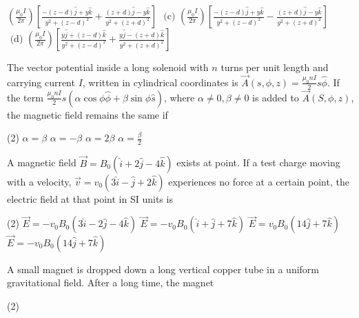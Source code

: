\begin{enumerate}
\begin{tasks}
	\task[\textbf{B.}]$\left(\frac{\mu_{0} I}{2 \pi}\right)\left[\frac{-(z-d) \hat{j}+y \hat{k}}{y^{2}+(z-d)^{2}}+\frac{(z+d) \hat{j}-y \hat{k}}{y^{2}+(z+d)^{2}}\right]$
	\task[\textbf{C.}]$\text { (c) }\left(\frac{\mu_{0} I}{2 \pi}\right)\left[\frac{-(z-d) \hat{j}+y \hat{k}}{y^{2}+(z-d)^{2}}-\frac{(z+d) \hat{j}-y \hat{k}}{y^{2}+(z+d)^{2}}\right]$
	\task[\textbf{D.}]$\text { (d) }\left(\frac{\mu_{0} I}{2 \pi}\right)\left[\frac{y \hat{j}+(z-d) \hat{k}}{y^{2}+(z-d)^{2}}+\frac{y \hat{j}-(z+d) \hat{k}}{y^{2}+(z+d)^{2}}\right]$
\end{tasks}
\begin{minipage}{\textwidth}
	\item The vector potential inside a long solenoid with $n$ turns per unit length and carrying current $I$, written in cylindrical coordinates is $\vec{A}(s, \phi, z)=\frac{\mu_{0} n I}{2} s \hat{\phi}$. If the term $\frac{\mu_{0} n I}{2} s(\alpha \cos \phi \hat{\phi}+\beta \sin \phi \hat{s})$, where $\alpha \neq 0, \beta \neq 0$ is added to $\vec{A}(S, \phi, z)$, the magnetic field remains the same if
\end{minipage}
\begin{tasks}(2)
	\task[\textbf{A.}]$\alpha=\beta$
	\task[\textbf{B.}]$\alpha=-\beta$
	\task[\textbf{C.}]$\alpha=2 \beta$
	\task[\textbf{D.}]$\alpha=\frac{\beta}{2}$
\end{tasks}
\begin{minipage}{\textwidth}
	\item A magnetic field $\vec{B}=B_{0}(\hat{i}+2 \hat{j}-4 \hat{k})$ exists at point. If a test charge moving with a velocity, $\vec{v}=v_{0}(3 \hat{i}-\hat{j}+2 \hat{k})$ experiences no force at a certain point, the electric field at that point in SI units is
\end{minipage}
\begin{tasks}(2)
	\task[\textbf{A.}] $\vec{E}=-v_{0} B_{0}(3 \hat{i}-2 \hat{j}-4 \hat{k})$
	\task[\textbf{B.}]$\vec{E}=-v_{0} B_{0}(\hat{i}+\hat{j}+7 \hat{k})$
	\task[\textbf{C.}]$\vec{E}=v_{0} B_{0}(14 \hat{j}+7 \hat{k})$
	\task[\textbf{D.}]$\vec{E}=-v_{0} B_{0}(14 \hat{j}+7 \hat{k})$
\end{tasks}
\begin{minipage}{\textwidth}
	\item A small magnet is dropped down a long vertical copper tube in a uniform gravitational field. After a long time, the magnet
\end{minipage}
\begin{tasks}(2)

\end{tasks}
\end{enumerate}

